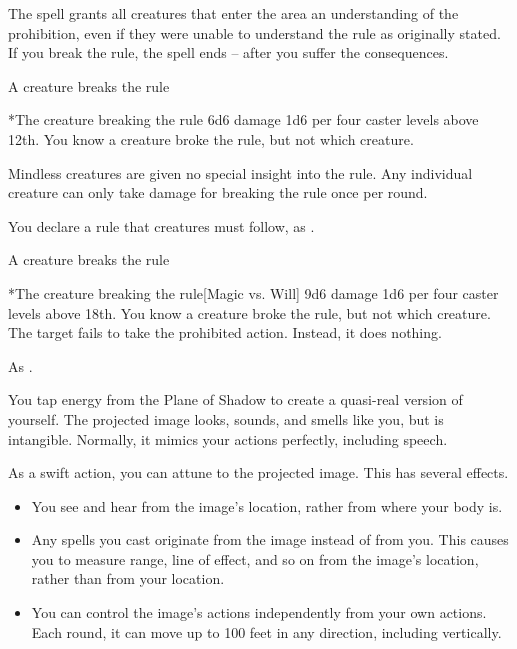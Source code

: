 The spell grants all creatures that enter the area an understanding of the prohibition, even if they were unable to understand the rule as originally stated. If you break the rule, the spell ends -- after you suffer the consequences.
\begin{spelltrigger}{A creature breaks the rule}
    \begin{spelltarget}*{The creature breaking the rule}
        \spelleffect 6d6 damage \add 1d6 per four caster levels above 12th. You know a creature broke the rule, but not which creature.
    \end{spelltarget}
\end{spelltrigger}
\spellnotes Mindless creatures are given no special insight into the rule. Any individual creature can only take damage for breaking the rule once per round.

\spelldur{\durshort}
\spellline
\spelleffect You declare a rule that creatures must follow, as .
\begin{spelltrigger}{A creature breaks the rule}
    \begin{spelltarget}*{The creature breaking the rule}[Magic vs. Will]
        \spelleffect 9d6 damage \add 1d6 per four caster levels above 18th. You know a creature broke the rule, but not which creature.
        \spellsuccess The target fails to take the prohibited action. Instead, it does nothing.
    \end{spelltarget}
\end{spelltrigger}
\spellnotes As .

\spellrng{\rngmed}
\spelldur{\durmed \dismissable}
\spellline
\spelleffect You tap energy from the Plane of Shadow to create a quasi-real version of yourself. The projected image looks, sounds, and smells like you, but is intangible. Normally, it mimics your actions perfectly, including speech.
\par As a swift action, you can attune to the projected image. This has several effects.
\begin{itemize}
    \item You see and hear from the image's location, rather from where your body is.
    \item Any spells you cast originate from the image instead of from you. This causes you to measure range, line of effect, and so on from the image's location, rather than from your location.
    \item You can control the image's actions independently from your own actions. Each round, it can move up to 100 feet in any direction, including vertically.
\end{itemize}

